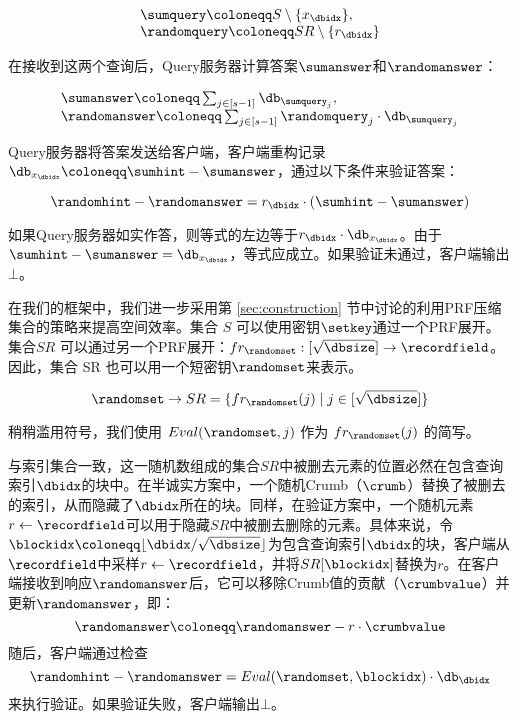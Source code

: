 $$
    \begin{array}{l}
        \sumquery \coloneqq  S \setminus \{x_\dbidx\}, \\
        \randomquery \coloneqq  SR \setminus \{r_\dbidx\}
    \end{array}
$$

在接收到这两个查询后，Query服务器计算答案$\sumanswer$和$\randomanswer$：

$$
    \begin{array}{l}
        \sumanswer \coloneqq  \sum_{j \in [s-1]} \db_{\sumquery_j}, \\
        \randomanswer \coloneqq  \sum_{j \in [s-1]} \randomquery_j\cdot \db_{\sumquery_j}
    \end{array}
$$

Query服务器将答案发送给客户端，客户端重构记录$\db_{x_\dbidx} \coloneqq \sumhint-\sumanswer$，通过以下条件来验证答案：

$$
    \randomhint-\randomanswer = r_\dbidx \cdot (\sumhint-\sumanswer)
$$

如果Query服务器如实作答，则等式的左边等于$r_{\dbidx} \cdot \db_{x_\dbidx}$。由于$\sumhint - \sumanswer = \db_{x_\dbidx}$，等式应成立。如果验证未通过，客户端输出 $\bot$。

在我们的框架中，我们进一步采用第 \ref{sec:construction} 节中讨论的利用PRF压缩集合的策略来提高空间效率。集合 $S$ 可以使用密钥$\setkey$通过一个PRF展开。集合$SR$ 可以通过另一个PRF展开：$fr_{\randomset}: [\sqrt{\dbsize}] \to \recordfield$。因此，集合 SR 也可以用一个短密钥$\randomset$来表示。

$$
    \randomset \to SR = \{fr_{\randomset}(j) \mid j\in[\sqrt{\dbsize}]\}
$$

稍稍滥用符号，我们使用 $Eval(\randomset, j)$ 作为 $fr_{\randomset}(j)$ 的简写。

与索引集合一致，这一随机数组成的集合$SR$中被删去元素的位置必然在包含查询索引$\dbidx$的块中。在半诚实方案中，一个随机Crumb（$\crumb$）替换了被删去的索引，从而隐藏了$\dbidx$所在的块。同样，在验证方案中，一个随机元素$r \leftarrow \recordfield$可以用于隐藏$SR$中被删去删除的元素。具体来说，令$\blockidx \coloneqq \lfloor \dbidx /\sqrt{\dbsize} \rfloor$为包含查询索引$\dbidx$的块，客户端从$\recordfield$中采样$r \leftarrow \recordfield$，并将$SR[\blockidx]$替换为$r$。在客户端接收到响应$\randomanswer$后，它可以移除Crumb值的贡献（$\crumbvalue$）并更新$\randomanswer$，即：
$$\randomanswer \coloneqq \randomanswer - r\cdot \crumbvalue$$
随后，客户端通过检查
$$\randomhint-\randomanswer = Eval(\randomset,\blockidx)\cdot \db_{\dbidx}$$
来执行验证。如果验证失败，客户端输出$\bot$。

